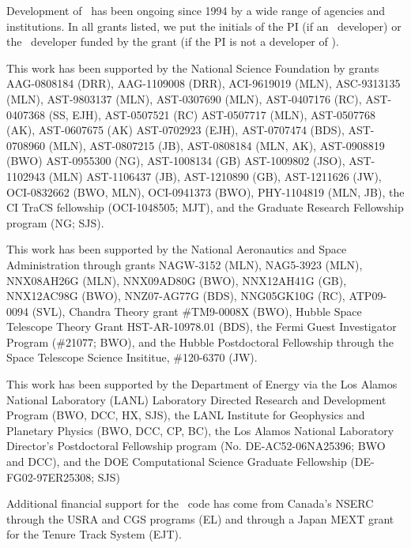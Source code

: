 
\acknowledgments

Development of \enzo\ has been ongoing since 1994 by a wide range of
agencies and institutions.  In all grants listed, we put the
initials of the PI (if an \enzo\ developer) or the \enzo\ developer
funded by the grant (if the PI is not a developer of \enzo).

This work has been supported by the National Science Foundation by
grants
AAG-0808184 (DRR),
AAG-1109008 (DRR),
ACI-9619019 (MLN),
ASC-9313135 (MLN),
AST-9803137 (MLN), 
AST-0307690 (MLN), 
AST-0407176 (RC),
AST-0407368 (SS, EJH),
AST-0507521 (RC) 
AST-0507717 (MLN), 
AST-0507768 (AK),
AST-0607675 (AK)
AST-0702923 (EJH),
AST-0707474 (BDS), 
AST-0708960 (MLN), 
AST-0807215 (JB),
AST-0808184 (MLN, AK),
AST-0908819 (BWO) 
AST-0955300 (NG),
AST-1008134 (GB) 
AST-1009802 (JSO), 
AST-1102943 (MLN)
AST-1106437 (JB),
AST-1210890 (GB),
AST-1211626 (JW),
OCI-0832662 (BWO, MLN),
OCI-0941373 (BWO),
PHY-1104819 (MLN, JB),
the CI TraCS fellowship (OCI-1048505; MJT),
and the Graduate Research Fellowship program (NG; SJS).

This work has been supported by the National Aeronautics and Space
Administration through grants
NAGW-3152 (MLN),
NAG5-3923 (MLN),
NNX08AH26G (MLN),
NNX09AD80G (BWO),
NNX12AH41G (GB),
NNX12AC98G (BWO),
NNZ07-AG77G (BDS),
NNG05GK10G (RC),
ATP09-0094 (SVL),
Chandra Theory grant \#TM9-0008X (BWO),
Hubble Space Telescope Theory Grant HST-AR-10978.01 (BDS),
the Fermi Guest Investigator Program (\#21077; BWO),
and the Hubble Postdoctoral Fellowship through the Space Telescope Science
Insititue, \#120-6370 (JW).

This work has been supported by the Department of Energy via the
Los Alamos National Laboratory (LANL) Laboratory Directed Research and
Development Program (BWO, DCC, HX, SJS), 
the LANL Institute for Geophysics and Planetary Physics (BWO, DCC, CP,
BC),
the Los Alamos National Laboratory Director's Postdoctoral Fellowship
program (No. DE-AC52-06NA25396;
BWO and DCC), and the
DOE Computational Science Graduate Fellowship (DE-FG02-97ER25308; SJS)

Additional financial support for the \enzo\ code has come from
Canada's NSERC through the USRA and CGS programs (EL) and through a 
Japan MEXT grant for the Tenure Track System (EJT).

